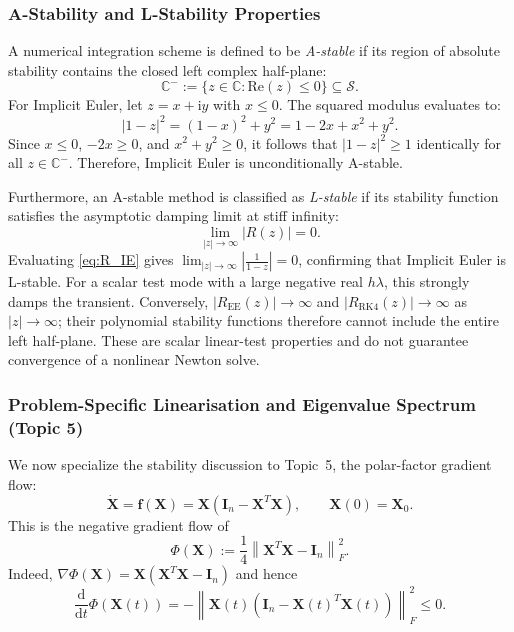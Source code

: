 \subsubsection{A-Stability and L-Stability Properties}
A numerical integration scheme is defined to be \emph{A-stable} if its region of absolute stability contains the closed left complex half-plane:
\begin{equation}
\label{eq:a_stability_def}
\mathbb{C}^- := \{ z \in \mathbb{C} : \mathrm{Re}(z) \le 0 \} \subseteq \mathcal{S}.
\end{equation}
For Implicit Euler, let $z = x + \mathrm{i}y$ with $x \le 0$. The squared modulus evaluates to:
\begin{equation}
\label{eq:a_stability_proof}
|1 - z|^2 = (1 - x)^2 + y^2 = 1 - 2x + x^2 + y^2.
\end{equation}
Since $x \le 0$, $-2x \ge 0$, and $x^2 + y^2 \ge 0$, it follows that $|1 - z|^2 \ge 1$ identically for all $z \in \mathbb{C}^-$. Therefore, Implicit Euler is unconditionally A-stable.

Furthermore, an A-stable method is classified as \emph{L-stable} if its stability function satisfies the asymptotic damping limit at stiff infinity:
\begin{equation}
\label{eq:l_stability_def}
\lim_{|z| \to \infty} |R(z)| = 0.
\end{equation}
Evaluating \eqref{eq:R_IE} gives $\lim_{|z| \to \infty} \left|\frac{1}{1 - z}\right| = 0$, confirming that Implicit Euler is L-stable. For a scalar test mode with a large negative real $h\lambda$, this strongly damps the transient. Conversely, $|R_{\mathrm{EE}}(z)|\to\infty$ and $|R_{\mathrm{RK4}}(z)|\to\infty$ as $|z|\to\infty$; their polynomial stability functions therefore cannot include the entire left half-plane. These are scalar linear-test properties and do not guarantee convergence of a nonlinear Newton solve.

\subsubsection{Problem-Specific Linearisation and Eigenvalue Spectrum (Topic 5)}
We now specialize the stability discussion to Topic~5, the polar-factor gradient flow:
\begin{equation}
\label{eq:polar_flow_spec}
\dot{\mathbf{X}} = \mathbf{f}(\mathbf{X}) = \mathbf{X}\left(\mathbf{I}_n - \mathbf{X}^T \mathbf{X}\right), \qquad \mathbf{X}(0) = \mathbf{X}_0.
\end{equation}
This is the negative gradient flow of
\begin{equation}
\label{eq:polar_lyapunov}
\Phi(\mathbf{X}) := \frac14\left\|\mathbf{X}^T\mathbf{X}-\mathbf{I}_n\right\|_F^2.
\end{equation}
Indeed, $\nabla\Phi(\mathbf{X})=\mathbf{X}(\mathbf{X}^T\mathbf{X}-\mathbf{I}_n)$ and hence
\begin{equation}
\label{eq:polar_lyapunov_decay}
\frac{\mathrm{d}}{\mathrm{d}t}\Phi(\mathbf{X}(t))
=-\left\|\mathbf{X}(t)\left(\mathbf{I}_n-\mathbf{X}(t)^T\mathbf{X}(t)\right)\right\|_F^2\le 0.
\end{equation}

